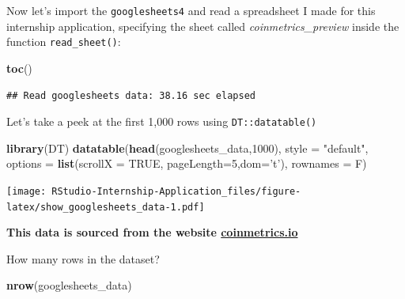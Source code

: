 \documentclass[
]{book}
\newenvironment{Shaded}{\begin{snugshade}}{\end{snugshade}}
\newcommand{\CommentTok}[1]{\textcolor[rgb]{0.56,0.35,0.01}{\textit{#1}}}
\newcommand{\DataTypeTok}[1]{\textcolor[rgb]{0.13,0.29,0.53}{#1}}
\newcommand{\DecValTok}[1]{\textcolor[rgb]{0.00,0.00,0.81}{#1}}
\newcommand{\KeywordTok}[1]{\textcolor[rgb]{0.13,0.29,0.53}{\textbf{#1}}}
\newcommand{\NormalTok}[1]{#1}
\newcommand{\OperatorTok}[1]{\textcolor[rgb]{0.81,0.36,0.00}{\textbf{#1}}}
\newcommand{\OtherTok}[1]{\textcolor[rgb]{0.56,0.35,0.01}{#1}}
\newcommand{\StringTok}[1]{\textcolor[rgb]{0.31,0.60,0.02}{#1}}
\begin{document}
Now let's import the \texttt{googlesheets4} and read a spreadsheet I made for this internship application, specifying the sheet called \emph{coinmetrics\_preview} inside the function \texttt{read\_sheet()}:

\begin{Shaded}
\end{Shaded}

\begin{Shaded}
\begin{Highlighting}[]
\KeywordTok{toc}\NormalTok{()}
\end{Highlighting}
\end{Shaded}

\begin{verbatim}
## Read googlesheets data: 38.16 sec elapsed
\end{verbatim}

Let's take a peek at the first 1,000 rows using \texttt{DT::datatable()} \citep{R-DT}

\begin{Shaded}
\begin{Highlighting}[]
\KeywordTok{library}\NormalTok{(DT)}
\KeywordTok{datatable}\NormalTok{(}\KeywordTok{head}\NormalTok{(googlesheets_data,}\DecValTok{1000}\NormalTok{),  }\DataTypeTok{style =} \StringTok{"default"}\NormalTok{, }
          \DataTypeTok{options =} \KeywordTok{list}\NormalTok{(}\DataTypeTok{scrollX =} \OtherTok{TRUE}\NormalTok{, }\DataTypeTok{pageLength=}\DecValTok{5}\NormalTok{,}\DataTypeTok{dom=}\StringTok{'t'}\NormalTok{), }\DataTypeTok{rownames =}\NormalTok{ F)}
\end{Highlighting}
\end{Shaded}

\texttt{[image: RStudio-Internship-Application\_files/figure-latex/show\_googlesheets\_data-1.pdf]}

\textbf{This data is sourced from the website \href{https://coinmetrics.io/community-network-data/\#comm-files}{coinmetrics.io}}

How many rows in the dataset?

\begin{Shaded}
\begin{Highlighting}[]
\KeywordTok{nrow}\NormalTok{(googlesheets_data)}
\end{Highlighting}
\end{Shaded}
\end{document}
